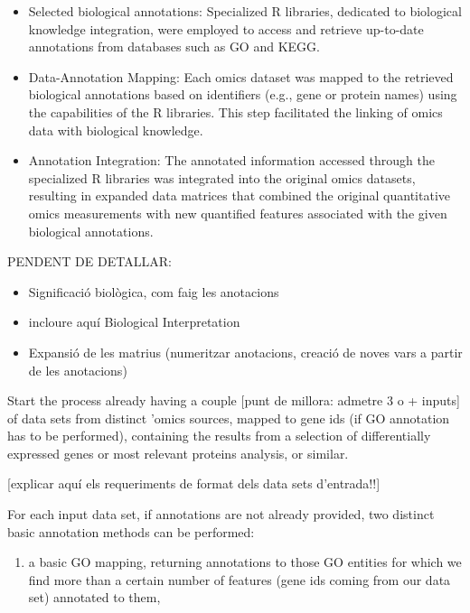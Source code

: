 \documentclass[a4paper, nobind]{templates/ociamthesis}
\providecommand{\tightlist}{%
  \setlength{\itemsep}{0pt}\setlength{\parskip}{0pt}}
\begin{document}
\begin{itemize}
\item
  Selected biological annotations: Specialized R libraries, dedicated to biological knowledge integration, were employed to access and retrieve up-to-date annotations from databases such as GO and KEGG.
\item
  Data-Annotation Mapping: Each omics dataset was mapped to the retrieved biological annotations based on identifiers (e.g., gene or protein names) using the capabilities of the R libraries. This step facilitated the linking of omics data with biological knowledge.
\item
  Annotation Integration: The annotated information accessed through the specialized R libraries was integrated into the original omics datasets, resulting in expanded data matrices that combined the original quantitative omics measurements with new quantified features associated with the given biological annotations.
\end{itemize}

PENDENT DE DETALLAR:

\begin{itemize}
\item
  Significació biològica, com faig les anotacions
\item
  incloure aquí Biological Interpretation
\item
  Expansió de les matrius (numeritzar anotacions, creació de noves vars a partir de les anotacions)
\end{itemize}

Start the process already having a couple {[}punt de millora: admetre 3 o + inputs{]} of data sets from distinct 'omics sources, mapped to gene ids (if GO annotation has to be performed), containing the results from a selection of differentially expressed genes or most relevant proteins analysis, or similar.

{[}explicar aquí els requeriments de format dels data sets d'entrada!!{]}

For each input data set, if annotations are not already provided, two distinct basic annotation methods can be performed:

\begin{enumerate}
\def\labelenumi{(\roman{enumi})}
\tightlist
\item
  a basic GO mapping, returning annotations to those GO entities for which we find more than a certain number of features (gene ids coming from our data set) annotated to them,
\end{enumerate}
\end{document}
